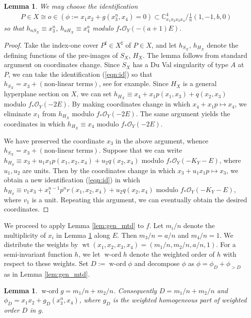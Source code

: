 \documentclass[a4paper,11pt]{amsart}
\newtheorem{lemma}[theorem]{Lemma}
\theoremstyle{definition}
\theoremstyle{remark}
\numberwithin{equation}{section}
\newcommand{\bC}{{\mathbb C}}
\newcommand{\cO}{{\mathcal O}}
\newcommand{\wt}{\operatorname{wt}}
\newcommand{\word}{\operatorname{w\textrm{-}ord}}
\begin{document}
\begin{lemma}\label{lem:id}
We may choose the identification
\begin{align}\label{eqn:id}
P \in X \cong o \in (\phi:=x_1x_2+g(x_3^n,x_4)=0) \subset
\bC^4_{x_1x_2x_3x_4} /\frac{1}{n}(1,-1,b,0)
\end{align}
so that $h_{nS_X}\equiv x_3^n$, $h_{aH_X}\equiv x_4^a$
modulo $f_*\cO_Y(-(a+1)E)$.
\end{lemma}

\begin{proof}
Take the index-one cover $P^\sharp \in X^\sharp$ of $P \in X$,
and let $h_{S_X}$, $h_{H_X}$ denote the defining functions of
the pre-images of $S_X$, $H_X$.
The lemma follows from standard argument on coordinates change.
Since $S_X$ has a Du Val singularity of type $A$ at $P$,
we can take the identification (\ref{eqn:id}) so that
$h_{S_X}=x_3+(\textrm{non-linear terms})$,
see \cite[Corollary 4]{Mo85} for example.
Since $H_X$ is a general hyperplane section on $X$,
we can set $h_{H_X}\equiv x_4+x_1p(x_1,x_3)+q(x_2,x_3)$ modulo $f_*\cO_Y(-2E)$.
By making coordinates change in which $x_4+x_1p \mapsto x_4$,
we eliminate $x_1$ from $h_{H_X}$ modulo $f_*\cO_Y(-2E)$.
The same argument yields the coordinates in which
$h_{H_X}\equiv x_4$ modulo $f_*\cO_Y(-2E)$.

We have preserved the coordinate $x_3$ in the above argument,
whence $h_{S_X}=x_3+(\textrm{non-linear terms})$.
Suppose that we can write
$h_{H_S}\equiv x_3+u_1x_1p(x_1,x_2,x_4)+u_2q(x_2,x_4)$
modulo $f_*\cO_Y(-K_Y-E)$,
where $u_1,u_2$ are units.
Then by the coordinates change in which $x_3+u_1x_1p \mapsto x_3$,
we obtain a new identification (\ref{eqn:id}) in which
$h_{H_S}\equiv v_1x_3+x_1^{n-1}p^nr(x_1,x_2,x_4)+u_2q(x_2,x_4)$
modulo $f_*\cO_Y(-K_Y-E)$,
where $v_1$ is a unit.
Repeating this argument,
we can eventually obtain the desired coordinates.
\end{proof}

We proceed to apply Lemma \ref{lem:gen_mtd} to $f$.
Let $m_i/n$ denote the multiplicity of $x_i$ in Lemma \ref{lem:id} along $E$.
Then $m_3/n=a/n$ and $m_4/n=1$.
We distribute the weights by $\wt(x_1,x_2,x_3,x_4)=(m_1/n,m_2/n,a/n,1)$.
For a semi-invariant function $h$,
we let $\word h$ denote the weighted order of $h$ with respect to
these weights.
Set $D:=\word \phi$
and decompose $\phi$ as $\phi=\phi_D+\phi_{>D}$ as in Lemma \ref{lem:gen_mtd}.

\begin{lemma}\label{lem:phi_d_A}
$\word g=m_1/n+m_2/n$.
Consequently $D=m_1/n+m_2/n$ and $\phi_D=x_1x_2+g_D(x_3^n,x_4)$,
where $g_D$ is the weighted homogeneous part of weighted order $D$ in $g$.
\end{lemma}
\end{document}
